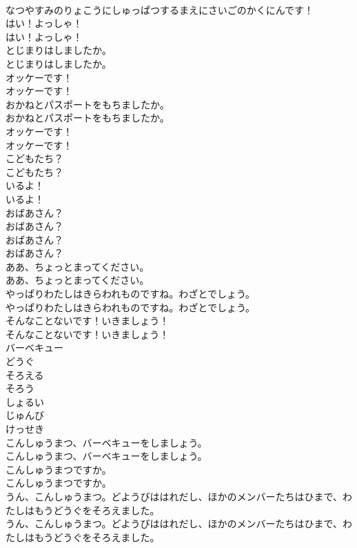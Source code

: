 \documentclass[8pt]{extreport}
\begin{document}
\begin{CJK}{UTF8}{min}
\\	なつやすみのりょこうにしゅっぱつするまえにさいごのかくにんです！ 
\\	はい！よっしゃ！	
\\	はい！よっしゃ！ 
\\	とじまりはしましたか。	
\\	とじまりはしましたか。 
\\	オッケーです！	
\\	オッケーです！ 
\\	おかねとパスポートをもちましたか。	
\\	おかねとパスポートをもちましたか。 
\\	オッケーです！	
\\	オッケーです！ 
\\	こどもたち？	
\\	こどもたち？ 
\\	いるよ！	
\\	いるよ！ 
\\	おばあさん？	
\\	おばあさん？ 
\\	おばあさん？	
\\	おばあさん？ 
\\	ああ、ちょっとまってください。	
\\	ああ、ちょっとまってください。 
\\	やっぱりわたしはきらわれものですね。わざとでしょう。	
\\	やっぱりわたしはきらわれものですね。わざとでしょう。 
\\	そんなことないです！いきましょう！	
\\	そんなことないです！いきましょう！ 
\\	バーベキュー
\\	どうぐ
\\	そろえる
\\	そろう
\\	しょるい
\\	じゅんび
\\	けっせき
\\	こんしゅうまつ、バーベキューをしましょう。	
\\	こんしゅうまつ、バーベキューをしましょう。 
\\	こんしゅうまつですか。	
\\	こんしゅうまつですか。 
\\	うん、こんしゅうまつ。どようびははれだし、ほかのメンバーたちはひまで、わたしはもうどうぐをそろえました。	
\\	うん、こんしゅうまつ。どようびははれだし、ほかのメンバーたちはひまで、わたしはもうどうぐをそろえました。 

\end{CJK}
\end{document}
